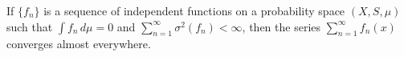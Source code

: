 If $\{f_n\}$ is a sequence of independent functions on a probability space $(X, S, \mu)$ such that $\int f_n \, d\mu = 0$ and $\sum_{n=1}^{\infty} \sigma^2(f_n) < \infty$, then the series $\sum_{n=1}^{\infty} f_n(x)$ converges almost everywhere.

